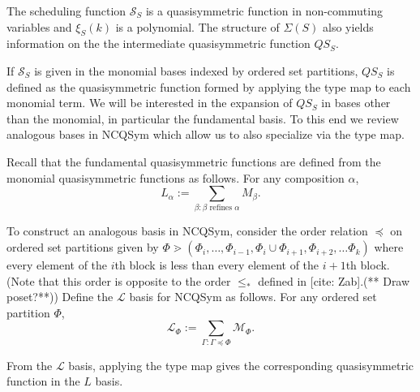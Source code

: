\documentclass[12pt,reqno]{amsart}
\numberwithin{definition}{section}
\theoremstyle{definition}
\newcommand{\SSS}{\mathcal{S}}
\newcommand{\defn}[1]{\emph{#1}}
\newcommand{\ncM}{\mathcal{M}}
\newcommand{\ncL}{\mathcal{L}}
\begin{document}





The scheduling function $\SSS_S$ is a quasisymmetric function in
non-commuting variables and $\xi_S(k)$ is a polynomial.  The structure
of $\Sigma(S)$ also yields information on the the intermediate
quasisymmetric function $QS_S$.

  If $\SSS_S$ is given in the monomial
bases indexed by ordered set partitions, $QS_S$ is defined as the
quasisymmetric function formed by applying the type map to each
monomial term.  We will be interested in the expansion of $QS_S$ in
bases other than the monomial, in particular the fundamental basis.
To this end we review analogous bases in NCQSym which allow us to also
specialize via the type map.


Recall that the fundamental quasisymmetric functions are defined from the monomial quasisymmetric functions as follows.  For any composition $\alpha$, 
$$L_{\alpha} := \sum_{\beta:\beta \textrm{ refines } \alpha} M_{\beta}.$$

To construct an analogous basis in NCQSym, consider the order relation $\preceq$ on ordered set partitions given by $\Phi \gtrdot (\Phi_i, \ldots,\Phi_{i-1}, \Phi_i \cup \Phi_{i+1}, \Phi_{i+2}, \ldots \Phi_k)$ where every element of the $i$th block is less than every element of the $i+1$th block. 
(Note that this order is opposite to the order $\leq_*$ defined in [cite: Zab].(** Draw poset?**))  Define the $\mathcal{L}$ basis for NCQSym as follows. For any ordered set partition $\Phi$,
$$\mathcal{L}_{\Phi} := \sum_{\Gamma:\Gamma \preceq \Phi} \ncM_{\Phi}.$$

From the $\ncL$ basis, applying the type map gives the corresponding quasisymmetric function in the $L$ basis.  



\end{document}
